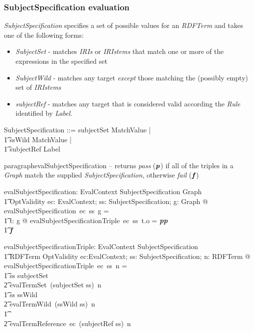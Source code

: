 \documentclass[fuzz]{llncs}
\def\entryFor{\cdot}
\def\pass{\textbf{\textit{p}}}
\def\fail{\textbf{\textit{f}}}
\def\zc{\textit}
\begin{document}
\subsubsection{SubjectSpecification evaluation}
\zc{SubjectSpecification} specifies a set of possible values for an \zc{RDFTerm} and takes one of the following forms:
\begin{itemize}
\item \zc{SubjectSet} - matches \zc{IRIs} or \zc{IRIstems} that match one or more of the expressions in the specified set
\item \zc{SubjectWild} - matches any target \emph{except} those matching the (possibly empty) set of \zc{IRIstems}
\item \zc{subjectRef} - matches any target that is considered valid according the \zc{Rule} identified by \zc{Label}.
\end{itemize}
\begin{zed}
SubjectSpecification ::=  subjectSet \ldata \power MatchValue \rdata | \\
\t1 ssWild \ldata \power MatchValue \rdata | \\
\t1 subjectRef \ldata Label \rdata
\end{zed}

paragraph{evalSubjectSpecification} -- returns \zc{pass} ($\pass$) if all of the triples in a \zc{Graph} 
match the supplied \zc{SubjectSpecification}, otherwise \zc{fail} ($\fail$)
\begin{gendef}
   evalSubjectSpecification: EvalContext \fun SubjectSpecification \fun Graph \fun \\
\t1 OptValidity
\where
   \forall ec: EvalContext; ss: SubjectSpecification; g: Graph @ \\ evalSubjectSpecification~ec~ss~g = \\
\t1 \IF \forall t: g @ evalSubjectSpecificationTriple~ec~ss~t.o = \pass \THEN \pass \\
\t1 \ELSE \fail
\end{gendef}
\begin{gendef}
   evalSubjectSpecificationTriple: EvalContext \fun SubjectSpecification \fun \\
\t1 RDFTerm \fun OptValidity
\where
   \forall ec:EvalContext; ss: SubjectSpecification; n: RDFTerm @ \\
  evalSubjectSpecificationTriple~ec~ss~n = \\
\t1 \IF ss \in \ran subjectSet \THEN \\
\t2 evalTermSet~(subjectSet \entryFor ss)~n \\
\t1 \ELSE \IF ss \in \ran ssWild \THEN \\
\t2 evalTermWild~(ssWild \entryFor ss)~n \\
\t1 \ELSE \\
\t2 evalTermReference~ec~(subjectRef \entryFor ss)~n
\end{gendef}
\end{document}
